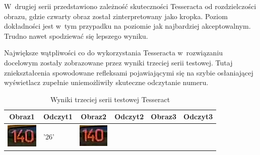 W~drugiej serii przedstawiono zależność skuteczności Tesseracta od 
rozdzielczości obrazu, gdzie czwarty obraz został zinterpretowany
jako kropka. Poziom dokładności jest w~tym przypadku na poziomie
jak najbardziej akceptowalnym. Trudno nawet spodziewać się lepszego
wyniku.

Największe wątpliwości
co do wykorzystania Tesseracta w~rozwiązaniu docelowym zostały zobrazowane
przez wyniki trzeciej serii testowej. Tutaj zniekształcenia spowodowane
refleksami pojawiającymi się na szybie osłaniającej wyświetlacz
zupełnie uniemożliwiły skuteczne odczytanie numeru.

\begin{table}[h!]
  \centering
  \caption{Wyniki trzeciej serii testowej Tesseract}\label{tbl:tess_03}
  \begin{tabular}{ | c | l | c | l | c | l | }
  	\hline
    Obraz1 & Odczyt1 & Obraz2 & Odczyt2 & Obraz3 & Odczyt3  \\ 
    \hline
    \begin{minipage}{.2\textwidth}
      \includegraphics[width=\textwidth]{img/exp_number_f01}
    \end{minipage}
    &
     '26'
    &
    \begin{minipage}{.2\textwidth}
      \includegraphics[width=\textwidth]{img/exp_number_f02}

\end{minipage}
\end{tabular}
\end{table}

